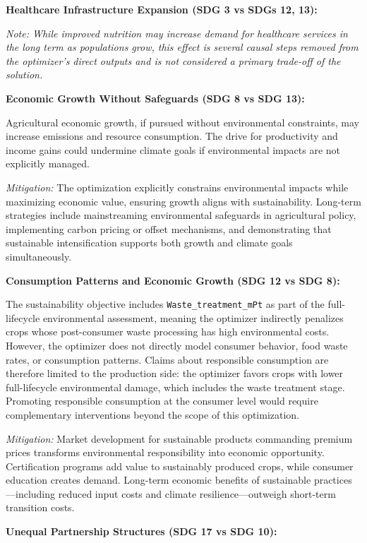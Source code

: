 \documentclass{oqireport}
\begin{document}
\textbf{Healthcare Infrastructure Expansion (SDG 3 vs SDGs 12, 13):}

\textit{Note: While improved nutrition may increase demand for healthcare services in the long term as populations grow, this effect is several causal steps removed from the optimizer's direct outputs and is not considered a primary trade-off of the solution.}

\textbf{Economic Growth Without Safeguards (SDG 8 vs SDG 13):}

Agricultural economic growth, if pursued without environmental constraints, may increase emissions and resource consumption. The drive for productivity and income gains could undermine climate goals if environmental impacts are not explicitly managed.

\textit{Mitigation:} The optimization explicitly constrains environmental impacts while maximizing economic value, ensuring growth aligns with sustainability. Long-term strategies include mainstreaming environmental safeguards in agricultural policy, implementing carbon pricing or offset mechanisms, and demonstrating that sustainable intensification supports both growth and climate goals simultaneously.

\textbf{Consumption Patterns and Economic Growth (SDG 12 vs SDG 8):}

The sustainability objective includes \texttt{Waste\_treatment\_mPt} as part of the full-lifecycle environmental assessment, meaning the optimizer indirectly penalizes crops whose post-consumer waste processing has high environmental costs. However, the optimizer does not directly model consumer behavior, food waste rates, or consumption patterns. Claims about responsible consumption are therefore limited to the production side: the optimizer favors crops with lower full-lifecycle environmental damage, which includes the waste treatment stage. Promoting responsible consumption at the consumer level would require complementary interventions beyond the scope of this optimization.

\textit{Mitigation:} Market development for sustainable products commanding premium prices transforms environmental responsibility into economic opportunity. Certification programs add value to sustainably produced crops, while consumer education creates demand. Long-term economic benefits of sustainable practices---including reduced input costs and climate resilience---outweigh short-term transition costs.

\textbf{Unequal Partnership Structures (SDG 17 vs SDG 10):}
\end{document}

